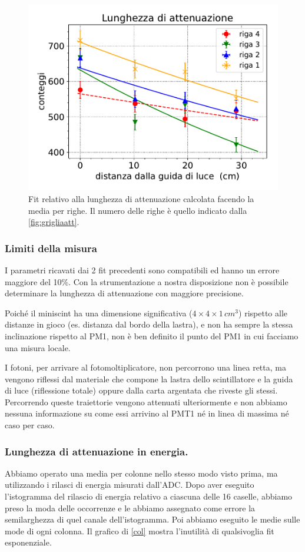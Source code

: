 \begin{figure}[h]
\centering
\includegraphics[width=8 cm]{4atte}
\caption{Fit relativo alla lunghezza di attenuazione calcolata facendo la media per righe. Il numero delle righe è quello indicato dalla \autoref{fig:grigliaatt}.}
\label{4atte}
\end{figure}


\subsubsection{Limiti della misura}

I parametri ricavati dai 2 fit precedenti sono compatibili ed hanno un errore maggiore del 10\%.
Con la strumentazione a nostra disposizione non è possibile determinare
la lunghezza di attenuazione con maggiore precisione.

Poiché il miniscint ha una dimensione significativa ($4\times4\times1\,\si{cm^3}$)
rispetto alle distanze in gioco (es. distanza dal bordo della lastra),
e non ha sempre la stessa inclinazione rispetto al PM1,
non è ben definito il punto del PM1 in cui facciamo una misura locale.

I fotoni, per arrivare al fotomoltiplicatore, non percorrono una linea retta,
ma vengono riflessi dal materiale che compone la lastra dello scintillatore e la guida di luce (riflessione totale)
oppure dalla carta argentata che riveste gli stessi.
Percorrendo queste traiettorie vengono attenuati ulteriormente e non abbiamo nessuna informazione
su come essi arrivino al PMT1 né in linea di massima né caso per caso.

\subsubsection{Lunghezza di attenuazione in energia.}

Abbiamo operato una media per colonne nello stesso modo visto prima, ma utilizzando i rilasci di energia misurati dall'ADC.
Dopo aver eseguito l'istogramma del rilascio di energia relativo a ciascuna delle 16 caselle,
abbiamo preso la moda delle occorrenze
e le abbiamo assegnato come errore la semilarghezza di quel canale dell'istogramma.
Poi abbiamo eseguito le medie sulle mode di ogni colonna.
Il grafico di \autoref{col} mostra l'inutilità di qualsivoglia fit esponenziale.

